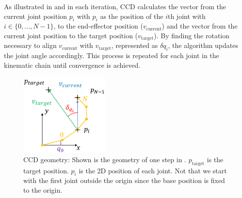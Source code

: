 As illustrated in  and  in each iteration, CCD calculates the vector from the current joint position $p_i$ with $p_i$ as the position of the $i$th joint with $i \in \{0, \ldots, N-1\}$, to the end-effector position ($v_\text{current}$) and the vector from the current joint position to the target position ($v_\text{target}$). By finding the rotation necessary to align $v_\text{current}$ with $v_\text{target}$, represented as $\delta q_i$, the algorithm updates the joint angle accordingly. This process is repeated for each joint in the kinematic chain until convergence is achieved.
\begin{figure}
	\centering
	\includegraphics[width=0.4\textwidth,]{figures/background/CCD_geometry.png}
	\caption[CCD geometry]{CCD geometry: Shown is the geometry of one step in . $p_\text{target}$ is the target position. $p_i$ is the 2D position of each joint. Not that we start with the first joint outside the origin since the base position is fixed to the origin.}
	\label{fig:background/CCD geometry}
\end{figure}

